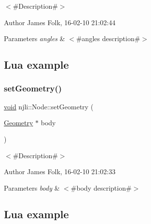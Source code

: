 $<$\#\+Description\#$>$ 

\begin{DoxyAuthor}{Author}
James Folk, 16-\/02-\/10 21\+:02\+:44
\end{DoxyAuthor}

\begin{DoxyParams}{Parameters}
{\em angles} & $<$\#angles description\#$>$\\
\hline
\end{DoxyParams}
\hypertarget{classnjli_1_1_steering_behavior_wander_ex1}{}\subsection{Lua example}\label{classnjli_1_1_steering_behavior_wander_ex1}

\begin{DoxyCodeInclude}
\end{DoxyCodeInclude}
\mbox{\label{classnjli_1_1_node_a6a280d81415c65eb8df641c470dc94f0}} 
\subsubsection{\texorpdfstring{set\+Geometry()}{setGeometry()}}
{\footnotesize\ttfamily \mbox{\hyperlink{_thread_8h_af1e856da2e658414cb2456cb6f7ebc66}{void}} njli\+::\+Node\+::set\+Geometry (\begin{DoxyParamCaption}\item[{\mbox{\hyperlink{classnjli_1_1_geometry}{Geometry}} $\ast$}]{body }\end{DoxyParamCaption})}



$<$\#\+Description\#$>$ 

\begin{DoxyAuthor}{Author}
James Folk, 16-\/02-\/10 21\+:02\+:33
\end{DoxyAuthor}

\begin{DoxyParams}{Parameters}
{\em body} & $<$\#body description\#$>$\\
\hline
\end{DoxyParams}
\hypertarget{classnjli_1_1_steering_behavior_wander_ex1}{}\subsection{Lua example}\label{classnjli_1_1_steering_behavior_wander_ex1}

